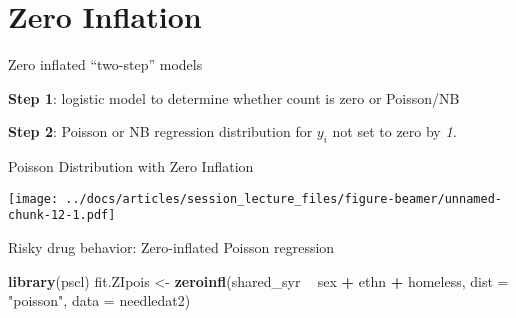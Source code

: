 \documentclass[
  ignorenonframetext,
]{beamer}
\newenvironment{Shaded}{\begin{snugshade}}{\end{snugshade}}
\newcommand{\DataTypeTok}[1]{\textcolor[rgb]{0.13,0.29,0.53}{#1}}
\newcommand{\KeywordTok}[1]{\textcolor[rgb]{0.13,0.29,0.53}{\textbf{#1}}}
\newcommand{\NormalTok}[1]{#1}
\newcommand{\OperatorTok}[1]{\textcolor[rgb]{0.81,0.36,0.00}{\textbf{#1}}}
\newcommand{\StringTok}[1]{\textcolor[rgb]{0.31,0.60,0.02}{#1}}
\begin{document}
\hypertarget{zero-inflation}{%
\section{Zero Inflation}\label{zero-inflation}}

\begin{frame}{Zero inflated ``two-step'' models}
\protect\hypertarget{zero-inflated-two-step-models}{}

\textbf{Step 1}: logistic model to determine whether count is zero or
Poisson/NB

\textbf{Step 2}: Poisson or NB regression distribution for \(y_i\) not
set to zero by \emph{1.}

\end{frame}

\begin{frame}{Poisson Distribution with Zero Inflation}
\protect\hypertarget{poisson-distribution-with-zero-inflation}{}

\texttt{[image: ../docs/articles/session\_lecture\_files/figure-beamer/unnamed-chunk-12-1.pdf]}

\end{frame}

\begin{frame}[fragile]{Risky drug behavior: Zero-inflated Poisson
regression}
\protect\hypertarget{risky-drug-behavior-zero-inflated-poisson-regression}{}

\begin{Shaded}
\begin{Highlighting}[]
\KeywordTok{library}\NormalTok{(pscl)}
\NormalTok{fit.ZIpois <-}\StringTok{ }\KeywordTok{zeroinfl}\NormalTok{(shared_syr }\OperatorTok{~}\StringTok{ }\NormalTok{sex }\OperatorTok{+}\StringTok{ }\NormalTok{ethn }\OperatorTok{+}\StringTok{ }\NormalTok{homeless,}
                       \DataTypeTok{dist =} \StringTok{"poisson"}\NormalTok{,}
                       \DataTypeTok{data =}\NormalTok{ needledat2)}
\end{Highlighting}
\end{Shaded}

\end{frame}
\end{document}
